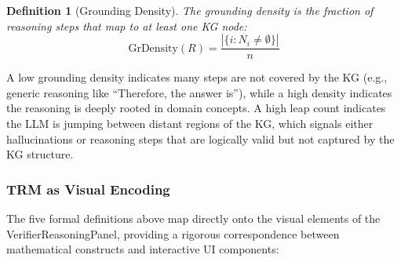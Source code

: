 \documentclass[journal,review]{vgtc}
\newtheorem{definition}{Definition}
\begin{document}
\begin{definition}[Grounding Density]
The \textit{grounding density} is the fraction of reasoning steps that map to at least one KG node:
\begin{equation}
\text{GrDensity}(R) = \frac{|\{i : N_i \neq \emptyset\}|}{n}
\end{equation}
\end{definition}

A low grounding density indicates many steps are not covered by the KG (e.g., generic reasoning like ``Therefore, the answer is''), while a high density indicates the reasoning is deeply rooted in domain concepts. A high leap count indicates the LLM is jumping between distant regions of the KG, which signals either hallucinations or reasoning steps that are logically valid but not captured by the KG structure.

\subsubsection{TRM as Visual Encoding}

The five formal definitions above map directly onto the visual elements of the VerifierReasoningPanel, providing a rigorous correspondence between mathematical constructs and interactive UI components:
\end{document}
